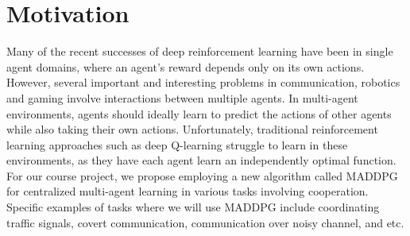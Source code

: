 
\section{Motivation}
\label{sec:motivation}

Many of the recent successes of deep reinforcement learning have been in
single agent domains, where an agent's reward depends only on its own actions.
However, several important and interesting problems in communication, robotics
and gaming involve interactions between multiple agents. In multi-agent
environments, agents should ideally learn to predict the actions of other
agents while also taking their own actions. Unfortunately, traditional
reinforcement learning approaches such as deep Q-learning struggle to learn in
these environments, as they have each agent learn an independently optimal
function. For our course project, we propose employing a new algorithm called
MADDPG~\cite{lowe2017multi} for centralized multi-agent learning in various
tasks involving cooperation. Specific examples of tasks where we will use
MADDPG include coordinating traffic signals, covert communication,
communication over noisy channel, and etc.
